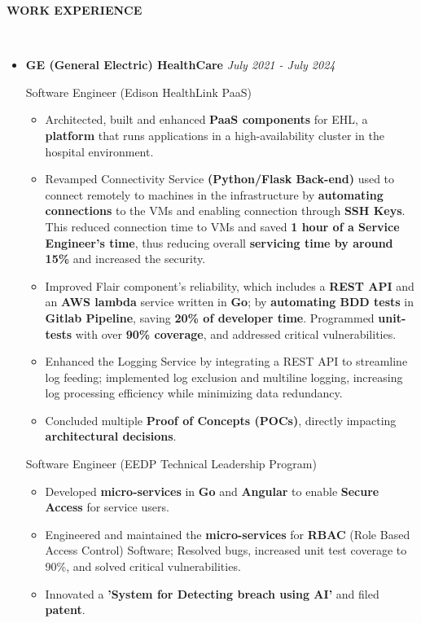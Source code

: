\documentclass[a4paper,10pt]{article}
\newcommand{\isep}{-2 pt}
\newcommand{\lsep}{-0.6cm}
\newcommand{\resheading}[1]{{\small \colorbox{mygrey}{\begin{minipage}{0.975\textwidth}{\textbf{#1 \vphantom{p\^{E}}}}\end{minipage}}}}
\begin{document}
\resheading{\textbf{WORK EXPERIENCE} }\\[\lsep]
\vspace{1.0pt}
\begin{itemize}
\item \textbf{GE (General Electric) HealthCare} \hfill \emph{July 2021 - July 2024}
\setlength{\itemsep}{1pt}
\setlength{\parskip}{0pt}
\setlength{\parsep}{0pt}

Software Engineer (Edison HealthLink PaaS)
\vspace{-2pt}
	\begin{itemize}\itemsep \isep
	\item Architected, built and enhanced \textbf{PaaS components} for EHL, a \textbf{platform} that runs applications in a high-availability cluster in the hospital environment. 
    \item Revamped Connectivity Service \textbf{(Python/Flask Back-end)} used to connect remotely to machines in the infrastructure by \textbf{automating connections} to the VMs and enabling connection through \textbf{SSH Keys}. This reduced connection time to VMs and saved \textbf{1 hour of a Service Engineer’s time}, thus reducing overall \textbf{servicing time by around 15\%} and increased the security.
     \item Improved Flair component's reliability, which includes a \textbf{REST API} and an \textbf{AWS lambda} service written in \textbf{Go}; by \textbf{automating BDD tests} in \textbf{Gitlab Pipeline}, saving \textbf{20\% of developer time}. Programmed \textbf{unit-tests} with over \textbf{90\% coverage}, and addressed critical vulnerabilities.
    \item Enhanced the Logging Service by integrating a REST API to streamline log feeding; implemented log exclusion and multiline logging, increasing log processing efficiency while minimizing data redundancy.
    \item Concluded multiple \textbf{Proof of Concepts (POCs)}, directly impacting \textbf{architectural decisions}.
	\end{itemize}
\vspace{-2pt}

Software Engineer (EEDP Technical Leadership Program)
\vspace{-2pt}
	\begin{itemize}\itemsep \isep
	\item Developed \textbf{micro-services} in \textbf{Go} and \textbf{Angular} to enable \textbf{Secure Access} for service users.
    \item Engineered and maintained the \textbf{micro-services} for \textbf{RBAC} (Role Based Access Control) Software; Resolved bugs, increased unit test coverage to 90\%, and solved critical vulnerabilities.
	\item  Innovated a \textbf{'System for Detecting breach using AI'} and filed \textbf{patent}.
	\end{itemize}
\vspace{-2pt}


\end{itemize}
\end{document}
